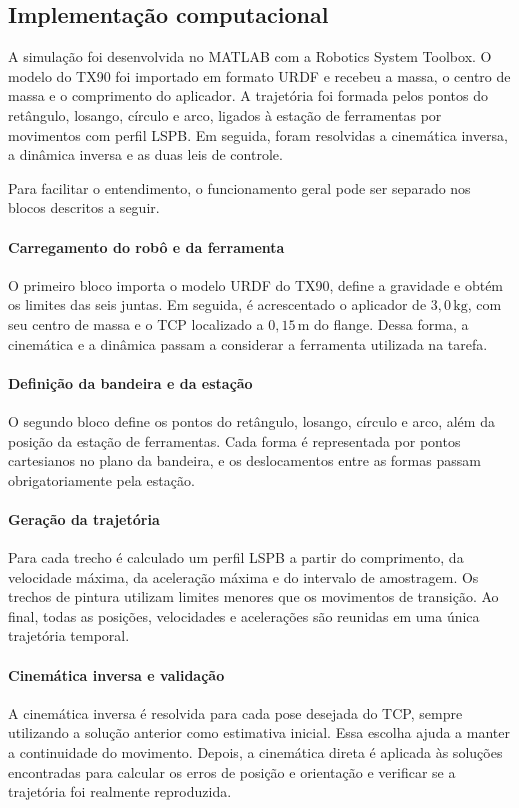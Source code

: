 \subsection{Implementação computacional}

A simulação foi desenvolvida no MATLAB com a Robotics System Toolbox. O modelo do TX90 foi importado em formato URDF e recebeu a massa, o centro de massa e o comprimento do aplicador. A trajetória foi formada pelos pontos do retângulo, losango, círculo e arco, ligados à estação de ferramentas por movimentos com perfil LSPB. Em seguida, foram resolvidas a cinemática inversa, a dinâmica inversa e as duas leis de controle.

Para facilitar o entendimento, o funcionamento geral pode ser separado nos blocos descritos a seguir.

\paragraph{Carregamento do robô e da ferramenta}
O primeiro bloco importa o modelo URDF do TX90, define a gravidade e obtém os limites das seis juntas. Em seguida, é acrescentado o aplicador de $3{,}0\,\text{kg}$, com seu centro de massa e o TCP localizado a $0{,}15\,\text{m}$ do flange. Dessa forma, a cinemática e a dinâmica passam a considerar a ferramenta utilizada na tarefa.

\paragraph{Definição da bandeira e da estação}
O segundo bloco define os pontos do retângulo, losango, círculo e arco, além da posição da estação de ferramentas. Cada forma é representada por pontos cartesianos no plano da bandeira, e os deslocamentos entre as formas passam obrigatoriamente pela estação.

\paragraph{Geração da trajetória}
Para cada trecho é calculado um perfil LSPB a partir do comprimento, da velocidade máxima, da aceleração máxima e do intervalo de amostragem. Os trechos de pintura utilizam limites menores que os movimentos de transição. Ao final, todas as posições, velocidades e acelerações são reunidas em uma única trajetória temporal.

\paragraph{Cinemática inversa e validação}
A cinemática inversa é resolvida para cada pose desejada do TCP, sempre utilizando a solução anterior como estimativa inicial. Essa escolha ajuda a manter a continuidade do movimento. Depois, a cinemática direta é aplicada às soluções encontradas para calcular os erros de posição e orientação e verificar se a trajetória foi realmente reproduzida.

